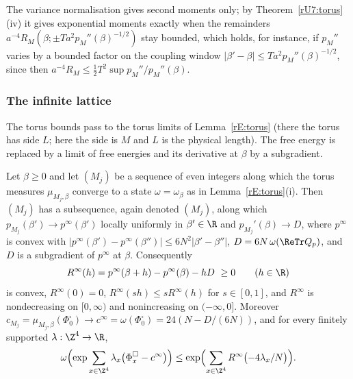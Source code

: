 The variance normalisation gives second moments only; by
Theorem~\ref{rU7:torus}(iv) it gives exponential moments exactly when the
remainders $a^{-4}R_M(\beta;\pm Ta^2p_M''(\beta)^{-1/2})$ stay bounded, which
holds, for instance, if $p_M''$ varies by a bounded factor on the coupling
window $|\beta'-\beta|\le Ta^2p_M''(\beta)^{-1/2}$, since then $a^{-4}R_M
\le\frac12T^2\sup p_M''/p_M''(\beta)$.
\subsubsection{The infinite lattice}\label{rU7:infinite}

The torus bounds pass to the torus limits of Lemma~\ref{rE:torus} (there
the torus has side $L$; here the side is $M$ and $L$ is the physical length).
The free energy is replaced by a limit of free energies and its derivative at
$\beta$ by a subgradient.

\begin{lemma}\label{rU7:pinf}
Let $\beta\ge0$ and let $(M_j)$ be a sequence of even integers along which the
torus measures $\mu_{M_j,\beta}$ converge to a state $\omega=\omega_\beta$ as
in Lemma~\ref{rE:torus}\textup{(i)}. Then $(M_j)$ has a subsequence, again
denoted $(M_j)$, along which $p_{M_j}(\beta')\to p^\infty(\beta')$ locally
uniformly in $\beta'\in\R$ and $p_{M_j}'(\beta)\to D$, where $p^\infty$ is
convex with $|p^\infty(\beta')-p^\infty(\beta'')|\le6N^2|\beta'-\beta''|$,
$D=6N\,\omega(\ReTr Q_p)$, and $D$ is a subgradient of $p^\infty$ at
$\beta$. Consequently
\[
R^\infty(h)=p^\infty(\beta+h)-p^\infty(\beta)-hD\ \ge0\qquad(h\in\R)
\]
is convex, $R^\infty(0)=0$, $R^\infty(sh)\le sR^\infty(h)$ for $s\in[0,1]$,
and $R^\infty$ is nondecreasing on $[0,\infty)$ and nonincreasing on
$(-\infty,0]$. Moreover $c_{M_j}=\mu_{M_j,\beta}(\Phi^\square_0)\to
c^\infty=\omega(\Phi^\square_0)=24(N-D/(6N))$, and for every finitely
supported $\lambda:\Z^4\to\R$,
\[
\omega\Bigl(\exp\sum_{x\in\Z^4}\lambda_x\bigl(\Phi^\square_x-c^\infty\bigr)
\Bigr)\le\exp\Bigl(\sum_{x\in\Z^4}R^\infty\bigl(-4\lambda_x/N\bigr)\Bigr).
\]
\end{lemma}

